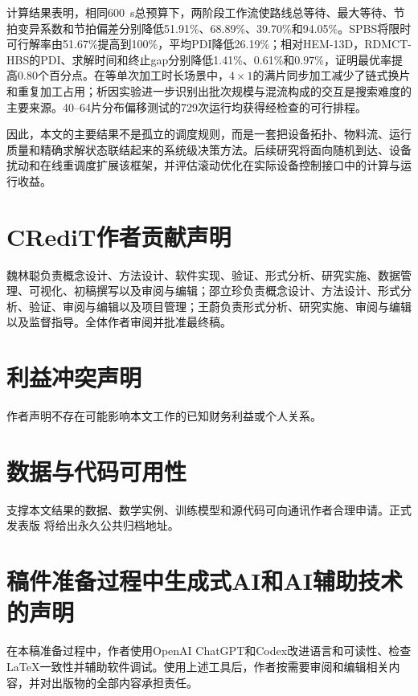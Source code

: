 \documentclass[final,5p,times,twocolumn]{elsarticle}
\newcommand{\method}{RDMCT-HBS}
\begin{document}
计算结果表明，相同600~s总预算下，两阶段工作流使路线总等待、最大等待、节拍变异系数和节拍偏差分别降低51.91\%、68.89\%、39.70\%和94.05\%。SPBS将限时可行解率由51.67\%提高到100\%，平均PDI降低26.19\%；相对HEM-13D，\method{}的PDI、求解时间和终止gap分别降低1.41\%、0.61\%和0.97\%，证明最优率提高0.80个百分点。在等单次加工时长场景中，$4\times1$的满片同步加工减少了链式换片和重复加工占用；析因实验进一步识别出批次规模与混流构成的交互是搜索难度的主要来源。40--64片分布偏移测试的729次运行均获得经检查的可行排程。

因此，本文的主要结果不是孤立的调度规则，而是一套把设备拓扑、物料流、运行质量和精确求解状态联结起来的系统级决策方法。后续研究将面向随机到达、设备扰动和在线重调度扩展该框架，并评估滚动优化在实际设备控制接口中的计算与运行收益。

\section*{CRediT作者贡献声明}
魏林聪负责概念设计、方法设计、软件实现、验证、形式分析、研究实施、数据管理、可视化、初稿撰写以及审阅与编辑；邵立珍负责概念设计、方法设计、形式分析、验证、审阅与编辑以及项目管理；王蔚负责形式分析、研究实施、审阅与编辑以及监督指导。全体作者审阅并批准最终稿。

\section*{利益冲突声明}
作者声明不存在可能影响本文工作的已知财务利益或个人关系。

\section*{数据与代码可用性}
支撑本文结果的数据、数学实例、训练模型和源代码可向通讯作者合理申请。正式发表版
将给出永久公共归档地址。

\section*{稿件准备过程中生成式AI和AI辅助技术的声明}
在本稿准备过程中，作者使用OpenAI ChatGPT和Codex改进语言和可读性、检查LaTeX一致性并辅助软件调试。使用上述工具后，作者按需要审阅和编辑相关内容，并对出版物的全部内容承担责任。
\end{document}
